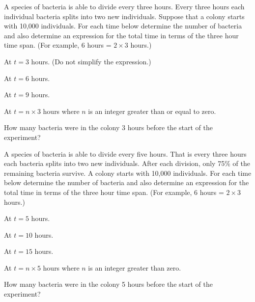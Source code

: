 \begin{problem}
\item A species of bacteria is able to divide every three hours.
  Every three hours each individual bacteria splits into two new
  individuals. Suppose that a colony starts with 10,000
  individuals. For each time below determine the number of bacteria
  and also determine an expression for the total time in terms of the
  three hour time span. (For example, 6 hours = $2\times 3$ hours.)
  \begin{subproblem}
  \item At $t=3$ hours. (Do not simplify the expression.)
    \vfill
  \item At $t=6$ hours. 
    \vfill
  \item At $t=9$ hours.
    \vfill
  \item At $t=n\times 3$ hours where $n$ is an integer greater than or
    equal to zero.  
    \vfill
  \item How many bacteria were in the colony 3 hours before the start
    of the experiment?
    \vfill
  \end{subproblem}

  \clearpage

\item A species of bacteria is able to divide every five hours. That
  is every three hours each bacteria splits into two new
  individuals. After each division, only 75\% of the remaining
  bacteria survive. A colony starts with 10,000 individuals. For each
  time below determine the number of bacteria and also determine an
  expression for the total time in terms of the three hour time
  span. (For example, 6 hours = $2\times 3$ hours.)
  \begin{subproblem}
  \item At $t=5$ hours. 
    \vfill
  \item At $t=10$ hours.
    \vfill
  \item At $t=15$ hours.
    \vfill
  \item At $t=n\times 5$ hours where $n$ is an integer greater than zero.
    \vfill
  \item How many bacteria were in the colony 5 hours before the start
    of the experiment?
    \vfill
  \end{subproblem}


\end{problem}
